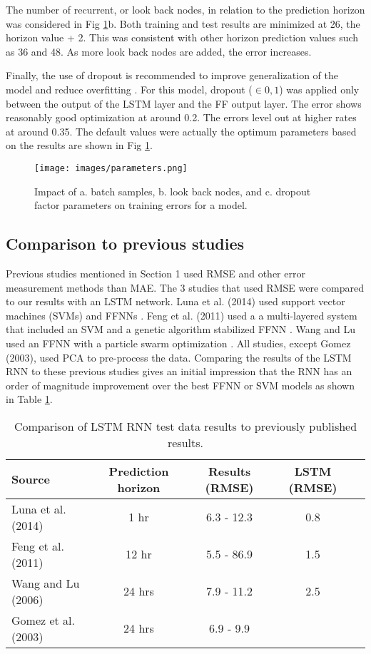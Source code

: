 \begin{linenumbers}
The number of recurrent, or look back nodes, in relation to the prediction horizon was considered in  Fig \ref{fig:parameters}b. Both training and test results are minimized at 26, the horizon value + 2. This was consistent with other horizon prediction values such as 36 and 48. As more look back nodes are added, the error increases.

Finally, the use of dropout is recommended to improve generalization of the model and reduce overfitting \citep{Gal2016}. For this model, dropout ($\in 0,1$) was applied only between the output of the LSTM layer and the FF output layer. The error shows reasonably good optimization at around 0.2. The errors level out at higher rates at around 0.35. The default values were actually the optimum parameters based on the results are shown in Fig \ref{fig:parameters}.
%
\begin{figure}
\centering
\texttt{[image: images/parameters.png]}  %
\caption[Impact of model parameters on training error]{Impact of a. batch samples, b. look back nodes, and c. dropout factor parameters on training errors for a model.}
\label{fig:parameters}
\end{figure}
%

\subsection{Comparison to previous studies}
Previous studies mentioned in Section 1 used RMSE and other error measurement methods than MAE. The 3 studies that used RMSE were compared to our results with an LSTM network. Luna et al. (2014) used support vector machines (SVMs) and FFNNs \citep{Luna2014}. Feng et al. (2011) used a a multi-layered system that included an SVM and a genetic algorithm stabilized FFNN \citep{Feng2011}. Wang and Lu used an FFNN with a particle swarm optimization \citep{Wang2006}. All studies, except Gomez (2003), used PCA to pre-process the data. Comparing the results of the LSTM RNN to these previous studies gives an initial impression  that the RNN has an order of magnitude improvement over the best FFNN or SVM models as shown in Table \ref{tb:compare}.
%
\end{linenumbers}
\begin{table}[]
\centering
\caption{Comparison of LSTM RNN test data results to previously published results.}
\label{tb:compare}
\begin{tabular}{@{}lcccc@{}}
\toprule
\textbf{Source} &  \textbf{Prediction horizon} & \textbf{Results (RMSE)} & \textbf{LSTM (RMSE)} \\ \midrule
Luna et al. (2014) & 1 hr & 6.3 - 12.3 & 0.8 \\
Feng et al. (2011) &  12 hr & 5.5 - 86.9 & 1.5 \\
Wang and Lu (2006) & 24 hrs & 7.9 - 11.2 & 2.5 \\ 
Gomez et al. (2003)& 24 hrs & 6.9 - 9.9 & \\ \bottomrule
\end{tabular}
\end{table}
